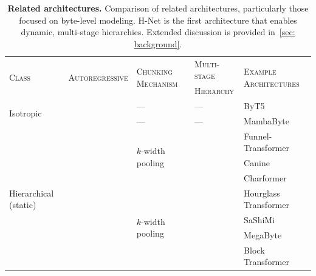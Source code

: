 \documentclass{article}
\newcommand{\cmark}{\ding{51}}
\newcommand{\xmark}{\ding{55}}
\newcommand{\model}{H-Net}
\theoremstyle{plain}
\theoremstyle{remark}
\begin{document}
\begin{table}[t!]
\caption{
\textbf{Related architectures.} Comparison of related architectures, particularly those focused on byte-level modeling.
\model{} is the first architecture that enables dynamic, multi-stage hierarchies.
Extended discussion is provided in~\cref{sec: background}.
}
\centering
\small
{ 
\begin{tabular}{@{}lllll@{}}
\toprule
\multirow{2}{*}{\textsc{Class}}                  & \multirow{2}{*}{\textsc{Autoregressive}} & \multirow{2}{*}{\textsc{Chunking Mechanism}}               & \textsc{Multi-stage}   & \multirow{2}{*}{\textsc{Example Architectures}} \\
                                &                          &                                           & \textsc{Hierarchy}    &  \\
\midrule
\multirow{2}{*}{\vspace{-1mm}Isotropic}                       & \xmark                   & ---                                       & ---                    & ByT5 \\
\cmidrule[0.05pt]{2-5}
                                & \cmark                   & ---                                       & ---                    & MambaByte \\
\midrule
\multirow{9}{*}{Hierarchical (static)}           & \multirow{3}{*}{\xmark}                   & \multirow{3}{*}{$k$-width pooling}                         & \multirow{3}{*}{\cmark}                 & Funnel-Transformer \\
                                &                          &                                           &                        & Canine \\
                                &                          &                                           &                        & Charformer \\
\cmidrule[0.05pt]{2-5}
                                & \multirow{6}{*}{\cmark}                   & \multirow{6}{*}{$k$-width pooling}                         & \multirow{6}{*}{\cmark}                 & Hourglass Transformer \\
                                &                          &                                           &                  & SaShiMi \\
                                &                          &                                           &                 & MegaByte \\
                                &                          &                                           &                 & Block Transformer \\

\end{tabular}}
\end{table}
\end{document}
